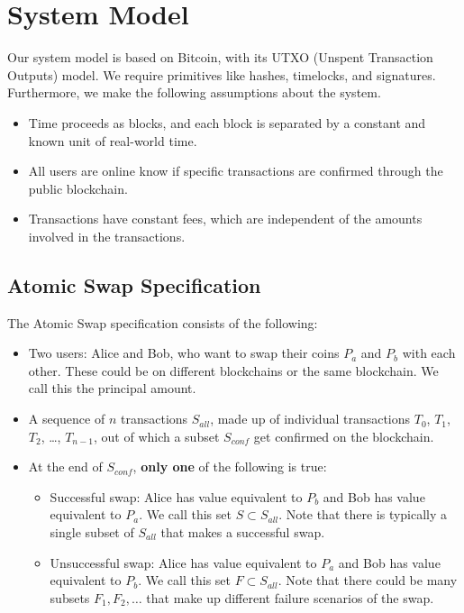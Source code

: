 \section{System Model}
Our system model is based on Bitcoin, with its UTXO (Unspent Transaction Outputs) model. We require primitives like hashes, timelocks, and signatures. Furthermore, we make the following assumptions about the system.
\begin{itemize}
    \item Time proceeds as blocks, and each block is separated by a constant and known unit of real-world time.
    \item All users are online know if specific transactions are confirmed through the public blockchain.
    \item Transactions have constant fees, which are independent of the amounts involved in the transactions.
\end{itemize}
\subsection{Atomic Swap Specification} \label{spec}
The Atomic Swap specification consists of the following:
\begin{itemize}
    \item Two users: Alice and Bob, who want to swap their coins $P_a$ and $P_b$ with each other. These could be on different blockchains or the same blockchain. We call this the principal amount.
    \item A sequence of $n$ transactions $S_{all}$, made up of individual transactions $T_0$, $T_1$, $T_2$, \ldots, $T_{n-1}$, out of which a subset $S_{conf}$ get confirmed on the blockchain.
    \item At the end of $S_{conf}$, \textbf{only one} of the following is true:
    \begin{itemize}
        \item Successful swap: Alice has value equivalent to $P_b$ and Bob has value equivalent to $P_a$. We call this set $S \subset S_{all}$. Note that there is typically a single subset of $S_{all} $ that makes a successful swap.
        \item Unsuccessful swap: Alice has value equivalent to $P_a$ and Bob has value equivalent to $P_b$. We call this set $F \subset S_{all}$. Note that there could be many subsets $F_1, F_2, \ldots$ that make up different failure scenarios of the swap.
    \end{itemize}
\end{itemize}

